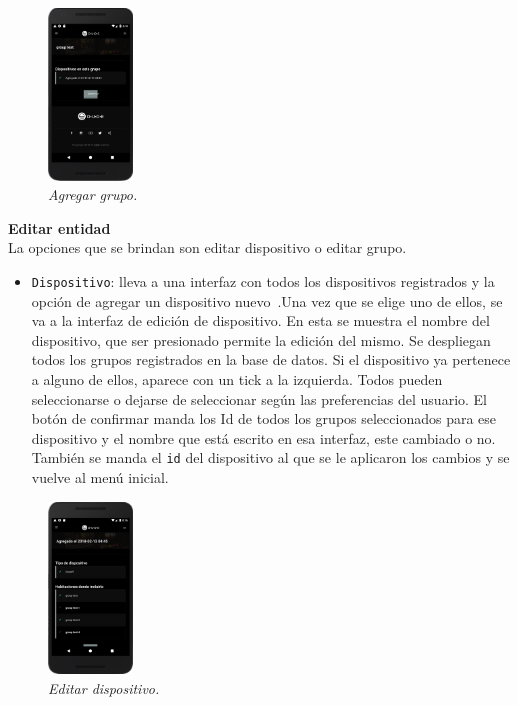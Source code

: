 \begin{figure}[H]
  \centering
  \includegraphics[width=0.2\textwidth, keepaspectratio]{images/app-movil-edit-group}
  \caption{\textit{Agregar grupo.}}
  \label{fig:app-movil-edit-group}
\end{figure}


\textbf{Editar entidad}\\
La opciones que se brindan son editar dispositivo o editar grupo.\\
\begin{itemize}
  \item \lstinline[columns=fixed]{Dispositivo}: lleva a una interfaz con todos los dispositivos registrados y la opción de agregar un dispositivo nuevo~.Una vez que se elige uno de ellos, se va a la interfaz de edición de dispositivo. En esta se muestra el nombre del dispositivo, que ser presionado permite la edición del mismo. Se despliegan todos los grupos registrados en la base de datos. Si el dispositivo ya pertenece a alguno de ellos, aparece con un tick a la izquierda. Todos pueden seleccionarse o dejarse de seleccionar según las preferencias del usuario. El botón de confirmar manda los Id de todos los grupos seleccionados para ese dispositivo y el nombre que está escrito en esa interfaz, este cambiado o no. También se manda el \lstinline[columns=fixed]{id} del dispositivo al que se le aplicaron los cambios y se vuelve al menú inicial.~
\end{itemize}

\begin{figure}[H]
  \centering
  \includegraphics[width=0.2\textwidth, keepaspectratio]{images/app-movil-edit-device}
  \caption{\textit{Editar dispositivo.}}
  \label{fig:app-movil-edit-device}
\end{figure}

